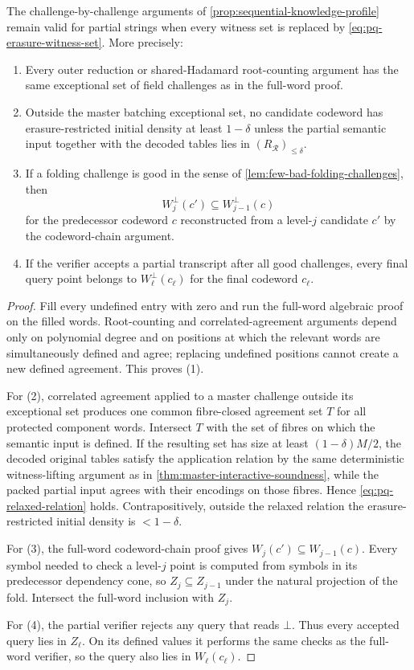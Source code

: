 \begin{lemma}
\label{lem:pq-erasure-stability}
The challenge-by-challenge arguments of \cref{prop:sequential-knowledge-profile} remain valid for partial strings when every witness set is replaced by \eqref{eq:pq-erasure-witness-set}.  More precisely:
\begin{enumerate}[label=(\arabic*),leftmargin=*]
  \item Every outer reduction or shared-Hadamard root-counting argument has the same exceptional set of field challenges as in the full-word proof.
  \item Outside the master batching exceptional set, no candidate codeword has erasure-restricted initial density at least $1-\delta$ unless the partial semantic input together with the decoded tables lies in $(R_{\mathcal R})_{\le\delta}$.
  \item If a folding challenge is good in the sense of \cref{lem:few-bad-folding-challenges}, then
  \[
     W_j^{\bot}(c')\subseteq W_{j-1}^{\bot}(c)
  \]
  for the predecessor codeword $c$ reconstructed from a level-$j$ candidate $c'$ by the codeword-chain argument.
  \item If the verifier accepts a partial transcript after all good challenges, every final query point belongs to $W_\ell^{\bot}(c_\ell)$ for the final codeword $c_\ell$.
\end{enumerate}
\end{lemma}

\begin{proof}
Fill every undefined entry with zero and run the full-word algebraic proof on the filled words.  Root-counting and correlated-agreement arguments depend only on polynomial degree and on positions at which the relevant words are simultaneously defined and agree; replacing undefined positions cannot create a new defined agreement.  This proves (1).

For (2), correlated agreement applied to a master challenge outside its exceptional set produces one common fibre-closed agreement set $T$ for all protected component words.  Intersect $T$ with the set of fibres on which the semantic input is defined.  If the resulting set has size at least $(1-\delta)M/2$, the decoded original tables satisfy the application relation by the same deterministic witness-lifting argument as in \cref{thm:master-interactive-soundness}, while the packed partial input agrees with their encodings on those fibres.  Hence \eqref{eq:pq-relaxed-relation} holds.  Contrapositively, outside the relaxed relation the erasure-restricted initial density is $<1-\delta$.

For (3), the full-word codeword-chain proof gives $W_j(c')\subseteq W_{j-1}(c)$.  Every symbol needed to check a level-$j$ point is computed from symbols in its predecessor dependency cone, so $Z_j\subseteq Z_{j-1}$ under the natural projection of the fold.  Intersect the full-word inclusion with $Z_j$.

For (4), the partial verifier rejects any query that reads $\bot$.  Thus every accepted query lies in $Z_\ell$.  On its defined values it performs the same checks as the full-word verifier, so the query also lies in $W_\ell(c_\ell)$.
\end{proof}

